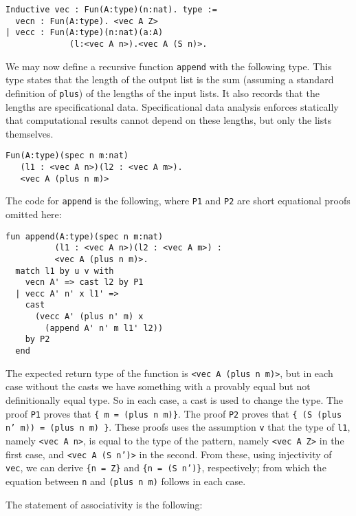 \documentclass[9pt,natbib]{sigplanconf}
\begin{document}
\begin{verbatim}
Inductive vec : Fun(A:type)(n:nat). type :=
  vecn : Fun(A:type). <vec A Z>
| vecc : Fun(A:type)(n:nat)(a:A)
             (l:<vec A n>).<vec A (S n)>.
\end{verbatim}

\noindent
We may now define a recursive function \texttt{append} with the
following type.  This type states that the length of the output list
is the sum (assuming a standard definition of \texttt{plus}) of the
lengths of the input lists.  It also records that the lengths are
specificational data.  Specificational data analysis enforces
statically that computational results cannot depend on these
lengths, but only the lists themselves.

\begin{verbatim}
Fun(A:type)(spec n m:nat)
   (l1 : <vec A n>)(l2 : <vec A m>).
   <vec A (plus n m)> 
\end{verbatim}


\noindent The code for \texttt{append} is the following, where
\texttt{P1} and \texttt{P2} are short equational proofs omitted here:

\begin{verbatim}
fun append(A:type)(spec n m:nat)
          (l1 : <vec A n>)(l2 : <vec A m>) :
          <vec A (plus n m)>.
  match l1 by u v with
    vecn A' => cast l2 by P1
  | vecc A' n' x l1' => 
    cast
      (vecc A' (plus n' m) x 
        (append A' n' m l1' l2)) 
    by P2
  end
\end{verbatim}
             
\noindent The expected return type of the function is \texttt{<vec A
(plus n m)>}, but in each case without the casts we have something
with a provably equal but not definitionally equal type.  So in each
case, a cast is used to change the type.  The proof \texttt{P1} proves
that \texttt{\{ m = (plus n m)\}}.  The proof \texttt{P2} proves that
\texttt{\{ (S (plus n' m)) = (plus n m) \}}.  These proofs uses the
assumption \texttt{v} that the type of \texttt{l1}, namely
\texttt{<vec A n>}, is equal to the type of the pattern, namely
\texttt{<vec A Z>} in the first case, and \texttt{<vec A (S n')>} in
the second.  From these, using injectivity of \texttt{vec}, we can
derive \texttt{\{n = Z\}} and \texttt{\{n = (S n')\}}, respectively;
from which the equation between \texttt{n} and \texttt{(plus n m)}
follows in each case.

The statement of associativity is the following:
\end{document}
